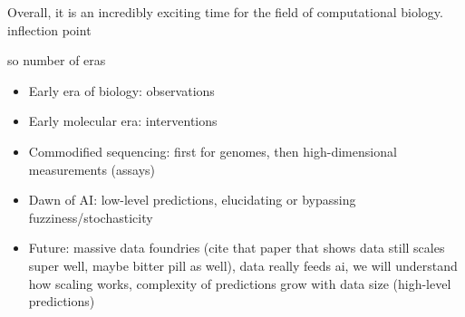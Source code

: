 Overall, it is an incredibly exciting time for the field of computational biology.
inflection point

so number of eras
\begin{itemize}[noitemsep]
	\item Early era of biology: observations
	\item Early molecular era: interventions
	\item Commodified sequencing: first for genomes, then high-dimensional measurements (assays)
	\item Dawn of AI: low-level predictions, elucidating or bypassing fuzziness/stochasticity
	\item Future: massive data foundries (cite that paper that shows data still scales super well, maybe bitter pill as well), data really feeds ai, we will understand how scaling works, complexity of predictions grow with data size (high-level predictions)
\end{itemize}


